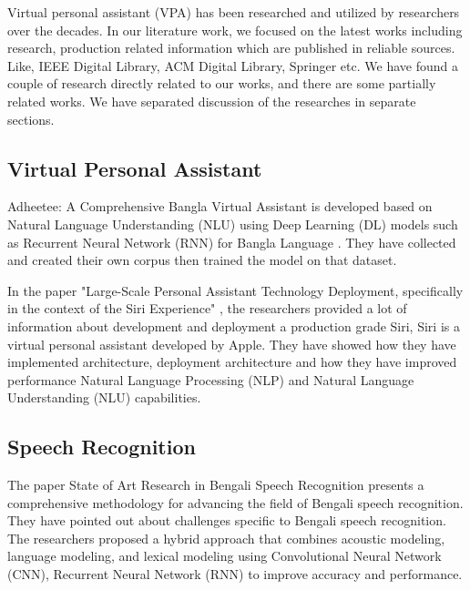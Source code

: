 Virtual personal assistant (VPA) has been researched and utilized by researchers over the decades.
In our literature work, we focused on the latest works including research, production related information which are published in reliable sources.
Like, IEEE Digital Library, ACM Digital Library, Springer etc.
We have found a couple of research directly related to our works, and there are some partially related works.
We have separated discussion of the researches in separate sections.

\subsection{Virtual Personal Assistant}\label{subsec:virtual-personal-assistant}
Adheetee: A Comprehensive Bangla Virtual Assistant is developed based on Natural Language Understanding (NLU) using Deep Learning (DL) models such as Recurrent Neural Network (RNN) for Bangla Language \cite{adheetee}.
They have collected and created their own corpus then trained the model on that dataset.

In the paper "Large-Scale Personal Assistant Technology Deployment, specifically in the context of the Siri Experience" \cite{siri-experience}, the researchers provided a lot of information about development and deployment a production grade Siri, Siri is a virtual personal assistant developed by Apple.
They have showed how they have implemented architecture, deployment architecture and how they have improved performance Natural Language Processing (NLP) and Natural Language Understanding (NLU) capabilities.

\subsection{Speech Recognition}\label{subsec:speech-recognition}
The paper State of Art Research in Bengali Speech Recognition \cite{speech-recog-bengali} presents a comprehensive methodology for advancing the field of Bengali speech recognition.
They have pointed out about challenges specific to Bengali speech recognition.
The researchers proposed a hybrid approach that combines acoustic modeling, language modeling, and lexical modeling using Convolutional Neural Network (CNN), Recurrent Neural Network (RNN) to improve accuracy and performance.

